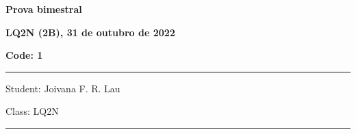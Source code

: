 \documentclass[12pt, addpoints]{exam}
\begin{document}
    \begin{minipage}[b]{0.75\linewidth}
        \begin{flushleft}
            {\bf \large Prova bimestral}
        \end{flushleft}
        \begin{flushleft}
            {\bf \large LQ2N (2B), 31 de outubro de 2022}
        \end{flushleft}
    \end{minipage}
    \begin{minipage}[b]{0.20\linewidth}
        \begin{flushright}
            {\bf \large Code: 1}
        \end{flushright}
    \end{minipage}
    \vspace{0.5cm} \hrule \vspace{0.5cm}
    \begin{minipage}{0.75\linewidth}
        \begin{flushleft}
            Student: Joivana F. R. Lau
        \end{flushleft}
    \end{minipage}
    \begin{minipage}{0.20\linewidth}
        \begin{flushright}
            Class: LQ2N
        \end{flushright}
    \end{minipage}
    \vspace{0.5cm} \hrule \vspace{0.5cm}
\end{document}
